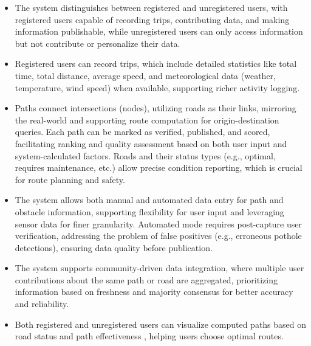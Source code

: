 \begin{itemize}[label=-]
    \item The system distinguishes between registered and unregistered users, with registered users capable of recording trips, contributing data, and making information publishable, while unregistered users can only access information but not contribute or personalize their data.
    \item Registered users can record trips, which include detailed statistics like total time, total distance, average speed, and meteorological data (weather, temperature, wind speed) when available, supporting richer activity logging. 
    \item Paths connect intersections (nodes), utilizing roads as their links, mirroring the real-world and supporting route computation for origin-destination queries. Each path can be marked as verified, published, and scored, facilitating ranking and quality assessment based on both user input and system-calculated factors. Roads and their status types (e.g., optimal, requires maintenance, etc.) allow precise condition reporting, which is crucial for route planning and safety.
    \item The system allows both manual and automated data entry for path and obstacle information, supporting flexibility for user input and leveraging sensor data for finer granularity. Automated mode requires post-capture user verification, addressing the problem of false positives (e.g., erroneous pothole detections), ensuring data quality before publication.
    \item The system supports community-driven data integration, where multiple user contributions about the same path or road are aggregated, prioritizing information based on freshness and majority consensus for better accuracy and reliability. 
    \item Both registered and unregistered users can visualize computed paths based on road status and path effectiveness , helping users choose optimal routes.
\end{itemize}

\newpage

